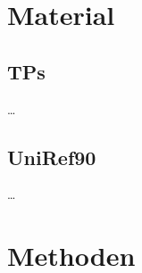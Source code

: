 \section{Material} %
\label{sec:material}
    \subsection{\aclp{TP}} %
    \label{sub:tp}
    \dots
    \subsection{UniRef90} %
    \label{sub:uniref90}
    \dots

\section{Methoden} %
    \label{sec:methoden}
